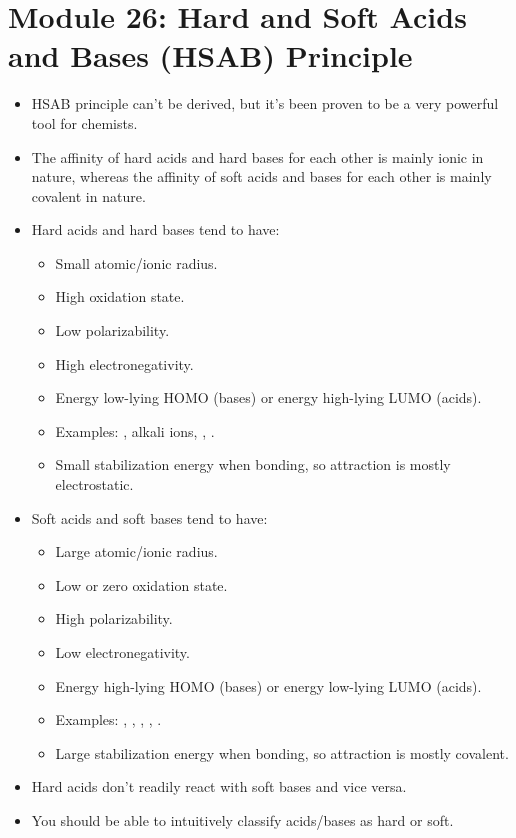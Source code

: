 \documentclass[../notes.tex]{subfiles}
\begin{document}
\section{Module 26: Hard and Soft Acids and Bases (HSAB) Principle}
\begin{itemize}
    \item HSAB principle can't be derived, but it's been proven to be a very powerful tool for chemists.
    \item The affinity of hard acids and hard bases for each other is mainly ionic in nature, whereas the affinity of soft acids and bases for each other is mainly covalent in nature.
    \item Hard acids and hard bases tend to have:
    \begin{itemize}
        \item Small atomic/ionic radius.
        \item High oxidation state.
        \item Low polarizability.
        \item High electronegativity.
        \item Energy low-lying HOMO (bases) or energy high-lying LUMO (acids).
        \item Examples: , alkali ions, , .
        \item Small stabilization energy when bonding, so attraction is mostly electrostatic.
    \end{itemize}
    \item Soft acids and soft bases tend to have:
    \begin{itemize}
        \item Large atomic/ionic radius.
        \item Low or zero oxidation state.
        \item High polarizability.
        \item Low electronegativity.
        \item Energy high-lying HOMO (bases) or energy low-lying LUMO (acids).
        \item Examples: , , , , .
        \item Large stabilization energy when bonding, so attraction is mostly covalent.
    \end{itemize}
    \item Hard acids don't readily react with soft bases and vice versa.
    \item You should be able to intuitively classify acids/bases as hard or soft.
    \begin{figure}[h!]
        \centering
\end{figure}
\end{itemize}
\end{document}

